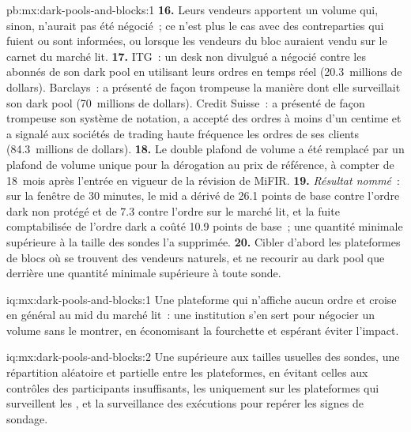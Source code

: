 \begin{solution}{pb:mx:dark-pools-and-blocks:1}
\textbf{16.} Leurs vendeurs apportent un volume qui, sinon, n'aurait pas été négocié~; ce n'est plus le cas avec des contreparties qui fuient ou sont informées, ou lorsque les vendeurs du bloc auraient
vendu sur le carnet du marché lit.
\textbf{17.} ITG~: un desk non divulgué a négocié contre les abonnés de son dark pool en utilisant leurs ordres en temps réel (20.3~millions de dollars). Barclays~: a présenté de façon trompeuse la manière dont
elle surveillait son dark pool (70~millions de dollars). Credit Suisse~: a présenté de façon trompeuse son système de notation, a accepté des ordres à moins d'un centime et a signalé aux sociétés de trading haute fréquence les
ordres de ses clients (84.3~millions de dollars).
\textbf{18.} Le double plafond de volume a été remplacé par un plafond de volume unique pour la dérogation au prix de référence, à compter de 18~mois après l'entrée en
vigueur de la révision de MiFIR.
\textbf{19.} \emph{Résultat nommé}~: sur la fenêtre de 30 minutes, le mid a dérivé de 26.1 points de base contre l'ordre dark non protégé et de 7.3 contre
l'ordre sur le marché lit, et la fuite comptabilisée de l'ordre dark a coûté 10.9 points de base~; une quantité minimale supérieure à la taille des sondes l'a supprimée.
\textbf{20.} Cibler d'abord les plateformes de blocs où se trouvent des vendeurs naturels, et ne recourir au dark pool que derrière une quantité minimale supérieure à toute sonde.
\end{solution}

\begin{solution}{iq:mx:dark-pools-and-blocks:1}
Une plateforme qui n'affiche aucun ordre et croise en général au mid du marché lit~: une institution s'en sert pour négocier un volume sans le montrer, en économisant la fourchette et
espérant éviter l'impact.
\end{solution}

\begin{solution}{iq:mx:dark-pools-and-blocks:2}
Une  supérieure aux tailles usuelles des sondes, une répartition aléatoire et partielle entre les plateformes, en évitant celles aux contrôles des participants insuffisants,
les  uniquement sur les plateformes qui surveillent les , et la surveillance des exécutions pour repérer les signes de sondage.
\end{solution}

